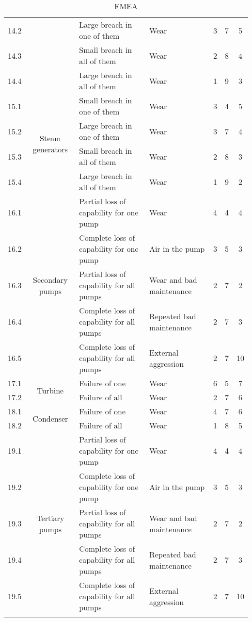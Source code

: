 \begin{longtable}{ccp{4cm}p{4cm}ccc}
    14.2 &                               & Large breach in one of them & Wear & 3 & 7 & 5 \\
    14.3 &                               & Small breach in all of them & Wear & 2 & 8 & 4 \\
    14.4 &                               & Large breach in all of them & Wear & 1 & 9 & 3 \\ \hline
    15.1 & \multirow{4}{3cm}{Steam generators}  & Small breach in one of them & Wear & 3 & 4 & 5 \\
    15.2 &                               & Large breach in one of them & Wear & 3 & 7 & 4 \\
    15.3 &                               & Small breach in all of them & Wear & 2 & 8 & 3 \\
    15.4 &                               & Large breach in all of them & Wear & 1 & 9 & 2 \\ \hline
    16.1 & \multirow{5}{3cm}{Secondary pumps}  & Partial loss of capability for one pump & Wear & 4 & 4 & 4 \\
    16.2 &                                & Complete loss of capability for one pump & Air in the pump & 3 & 5 & 3 \\
    16.3 &                                & Partial loss of capability for all pumps & Wear and bad maintenance & 2 & 7 & 2 \\
    16.4 &                                & Complete loss of capability for all pumps & Repeated bad maintenance & 2 & 7 & 3 \\
    16.5 &                                & Complete loss of capability for all pumps & External aggression & 2 & 7 & 10 \\ \hline
    17.1 & \multirow{2}{3cm}{Turbine} & Failure of one & Wear & 6 & 5 & 7 \\
    17.2 &                               & Failure of all & Wear & 2 & 7 & 6 \\ \hline
    18.1 & \multirow{2}{3cm}{Condenser} & Failure of one & Wear & 4 & 7 & 6 \\
    18.2 &                               & Failure of all & Wear & 1 & 8 & 5 \\ \hline
    19.1 & \multirow{5}{3cm}{Tertiary pumps}  & Partial loss of capability for one pump & Wear & 4 & 4 & 4 \\
    19.2 &                                & Complete loss of capability for one pump & Air in the pump & 3 & 5 & 3 \\
    19.3 &                                & Partial loss of capability for all pumps & Wear and bad maintenance & 2 & 7 & 2 \\
    19.4 &                                & Complete loss of capability for all pumps & Repeated bad maintenance & 2 & 7 & 3 \\
    19.5 &                                & Complete loss of capability for all pumps & External aggression & 2 & 7 & 10 \\ \hline
\caption{FMEA}
\label{tab:fmea_risk}
\end{longtable}


